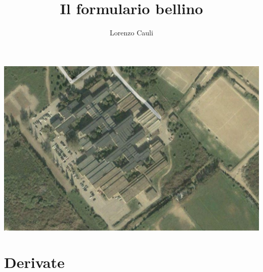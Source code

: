 \documentclass[10pt, a4paper]{article}
\title{Il formulario bellino}
\author{Lorenzo Cauli}
\begin{document}
    \maketitle
    \hspace{-35pt}\includegraphics[width=400pt]{images/scano.png}
    \newpage
    \tableofcontents

    \newpage
    \part{Derivate}
\end{document}
